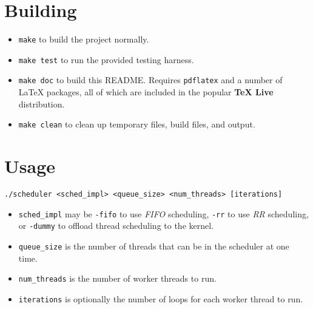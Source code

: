 \documentclass[paper=a4, fontsize=11pt]{scrartcl}
\begin{document}
\section*{Building}
\begin{itemize}
  \item \texttt{make} to build the project normally.

  \item \texttt{make test} to run the provided testing harness.

  \item \texttt{make doc} to build this README. Requires \texttt{pdflatex} and a number of \LaTeX\hspace{0em} packages, all of which are included in the popular \textbf{TeX Live} distribution.

  \item \texttt{make clean} to clean up temporary files, build files, and output.
\end{itemize} 

\section*{Usage}
\texttt{./scheduler <sched\_impl> <queue\_size> <num\_threads> [iterations]}

\begin{itemize}
  \item \texttt{sched\_impl} may be \texttt{-fifo} to use \textit{FIFO} scheduling, \texttt{-rr} to use \textit{RR} scheduling, or \texttt{-dummy} to offload thread scheduling to the kernel.

  \item \texttt{queue\_size} is the number of threads that can be in the scheduler at one time.

  \item \texttt{num\_threads} is the number of worker threads to run.

  \item \texttt{iterations} is optionally the number of loops for each worker thread to run.
\end{itemize}


\end{document}
